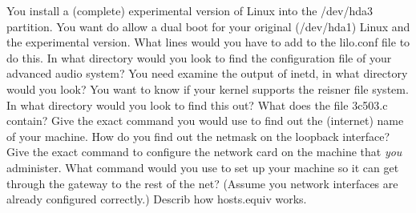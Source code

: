 You install a (complete) experimental version of Linux into the 
{\ltt{}/dev/hda3} partition. You want do allow a dual boot for your
original ({\ltt{}/dev/hda1}) Linux and the experimental version.
What lines would you have to add to the {\ltt{}lilo.conf} file to do this.
\vfill\eject
\ques
In what directory would you look to find the configuration file
of your advanced audio system?
\vskip 0.5in
You need examine the output of {\ltt{}inetd},
in what directory would you look?
\vskip 0.5in
You want to know if your kernel supports the reisner file system.
In what directory would you look to find this out?
\vskip 0.5in
\ques
What does the file {\ltt{}3c503.c} contain?
\vskip 0.5in
Give the exact command you would use to find out
the (internet) name  of your machine.
\vskip 0.5in
How do you find out the netmask on the loopback interface?
\vskip 0.5in
\ques
Give the exact command to configure the network card on the machine
that {\it you} administer.
\vskip 0.5in
What command would you use to set up your machine so
it can get through the gateway to the rest of the net?
(Assume you network interfaces are already configured correctly.)
\vskip 0.5in
Describ how {\ltt{}hosts.equiv} works.
\vskip 0.5in
\bye
